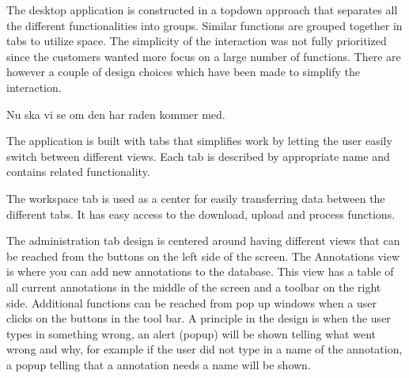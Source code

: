 The desktop application is constructed in a topdown approach that separates all the different functionalities into groups.
Similar functions are grouped together in tabs to utilize space. The simplicity of the interaction was not fully prioritized since the customers wanted more focus on a large number of functions. There are however a couple of design choices which have been made to simplify the interaction.

Nu ska vi se om den har raden kommer med.

The application is built with tabs that simplifies work by letting the user easily switch between different views. Each tab is described by appropriate name and contains related functionality.

The workspace tab is used as a center for easily transferring data between the different tabs. It has easy access to the download, upload and process functions.

The administration tab design is centered around having different views that can be reached from the buttons on the left side of the screen. The Annotations view is where you can add new annotations to the database. This view has a table of all current annotations in the middle of the screen and a toolbar on the right side. Additional functions can be reached from pop up windows when a user clicks on the buttons in the tool bar.
A principle in the design is when the user types in something wrong, an alert (popup) will be shown telling what went wrong and why, for example if the user did not type in a name of the annotation, a popup telling that a annotation needs a name will be shown.  
\FloatBarrier

